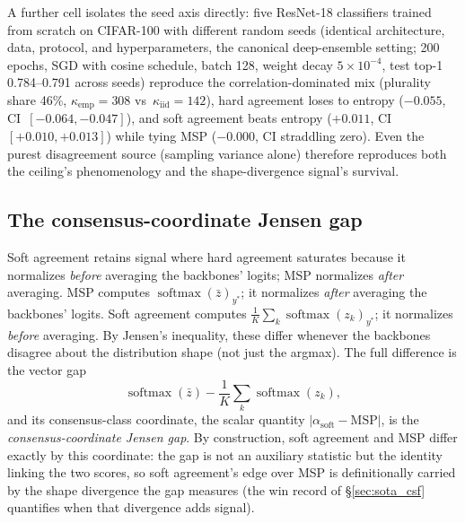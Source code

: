 \documentclass[a4paper,fleqn]{cas-sc}
\begin{document}
A further cell isolates the seed axis directly: five ResNet-18 classifiers trained from scratch on CIFAR-100 with different random seeds (identical architecture, data, protocol, and hyperparameters, the canonical deep-ensemble setting; 200 epochs, SGD with cosine schedule, batch 128, weight decay $5\times 10^{-4}$, test top-1 0.784--0.791 across seeds) reproduce the correlation-dominated mix (plurality share 46\%, $\kappa_{\text{emp}}=308$ vs~$\kappa_{\text{iid}}=142$), hard agreement loses to entropy ($-0.055$, CI~$[-0.064,-0.047]$), and soft agreement beats entropy ($+0.011$, CI~$[+0.010,+0.013]$) while tying MSP ($-0.000$, CI straddling zero).
Even the purest disagreement source (sampling variance alone) therefore reproduces both the ceiling's phenomenology and the shape-divergence signal's survival.



\subsection{The consensus-coordinate Jensen gap}
\label{sec:jensen_gap}
Soft agreement retains signal where hard agreement saturates because it normalizes \emph{before} averaging the backbones' logits; MSP normalizes \emph{after} averaging.
MSP computes $\operatorname{softmax}(\bar{z})_{y^*}$; it normalizes \emph{after} averaging the backbones' logits.
Soft agreement computes $\frac{1}{K}\sum_k \operatorname{softmax}(z_k)_{y^*}$; it normalizes \emph{before} averaging.
By Jensen's inequality, these differ whenever the backbones disagree about the distribution shape (not just the argmax).
The full difference is the vector gap
\begin{equation}
\operatorname{softmax}(\bar{z}) - \frac{1}{K}\sum_k \operatorname{softmax}(z_k),
\label{eq:jensen_gap}
\end{equation}
and its consensus-class coordinate, the scalar quantity $|\alpha_{\text{soft}} - \text{MSP}|$, is the \emph{consensus-coordinate Jensen gap}.
By construction, soft agreement and MSP differ exactly by this coordinate: the gap is not an auxiliary statistic but the identity linking the two scores, so soft agreement's edge over MSP is definitionally carried by the shape divergence the gap measures (the win record of \S\ref{sec:sota_csf} quantifies when that divergence adds signal).
\end{document}
